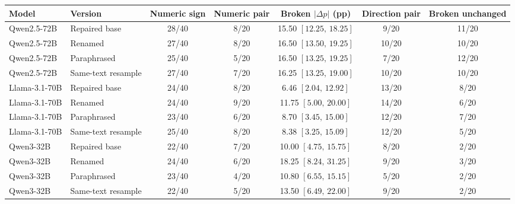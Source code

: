 \begin{tabular}{@{}llccccc@{}}
\toprule
Model & Version & Numeric sign & Numeric pair & Broken $|\Delta p|$ (pp) & Direction pair & Broken unchanged \\
\midrule
Qwen2.5-72B & Repaired base & 28/40 & 8/20 & 15.50 $[12.25,\,18.25]$ & 9/20 & 11/20 \\
Qwen2.5-72B & Renamed & 27/40 & 8/20 & 16.50 $[13.50,\,19.25]$ & 10/20 & 10/20 \\
Qwen2.5-72B & Paraphrased & 25/40 & 5/20 & 16.50 $[13.25,\,19.25]$ & 7/20 & 12/20 \\
Qwen2.5-72B & Same-text resample & 27/40 & 7/20 & 16.25 $[13.25,\,19.00]$ & 10/20 & 10/20 \\
Llama-3.1-70B & Repaired base & 24/40 & 8/20 & 6.46 $[2.04,\,12.92]$ & 13/20 & 8/20 \\
Llama-3.1-70B & Renamed & 24/40 & 9/20 & 11.75 $[5.00,\,20.00]$ & 14/20 & 6/20 \\
Llama-3.1-70B & Paraphrased & 23/40 & 6/20 & 8.70 $[3.45,\,15.00]$ & 12/20 & 7/20 \\
Llama-3.1-70B & Same-text resample & 25/40 & 8/20 & 8.38 $[3.25,\,15.09]$ & 12/20 & 5/20 \\
Qwen3-32B & Repaired base & 22/40 & 7/20 & 10.00 $[4.75,\,15.75]$ & 8/20 & 2/20 \\
Qwen3-32B & Renamed & 24/40 & 6/20 & 18.25 $[8.24,\,31.25]$ & 9/20 & 3/20 \\
Qwen3-32B & Paraphrased & 23/40 & 4/20 & 10.80 $[6.55,\,15.15]$ & 5/20 & 2/20 \\
Qwen3-32B & Same-text resample & 22/40 & 5/20 & 13.50 $[6.49,\,22.00]$ & 9/20 & 2/20 \\
\bottomrule
\end{tabular}
